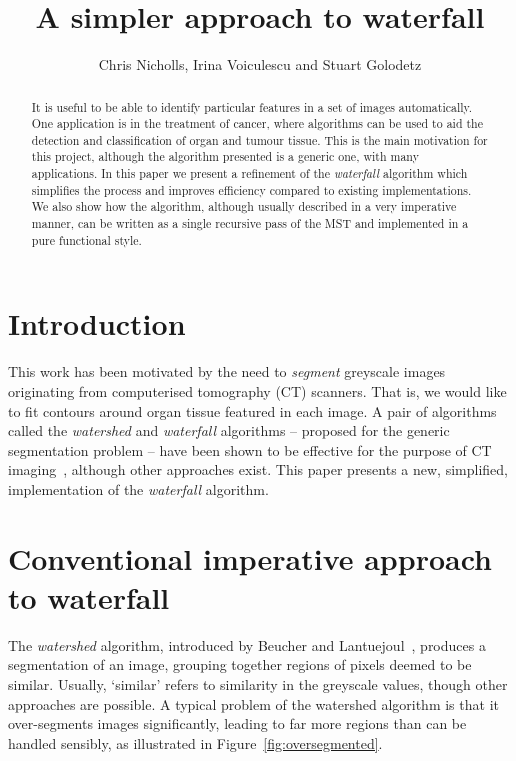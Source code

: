 \documentclass{jfp}
\title{\LARGE \bf
A simpler approach to waterfall
}
\author{Chris Nicholls, Irina Voiculescu and Stuart Golodetz
}
\begin{document}
\maketitle

\begin{abstract}
It is useful to be able to identify particular features in a set of
images automatically. One application is in the treatment of cancer,
where algorithms can be used to aid the detection and classification
of organ and tumour tissue. This is the main motivation for this
project, although the algorithm presented is a generic one, with many
applications.
In this paper we present a refinement of the {\em waterfall\/}
algorithm which simplifies the process and improves efficiency
compared to existing implementations.
We also show how the algorithm, although usually described in a very
imperative manner, can be written as a single recursive pass of the MST
and implemented in a pure functional style.


\end{abstract}

\section{Introduction}

This work has been motivated by the need to {\em segment\/} greyscale
images originating from computerised tomography (CT) scanners. That
is, we would like to fit contours around organ tissue featured in each
image. A pair of algorithms called the {\em watershed\/} and {\em
waterfall\/} algorithms -- proposed for the generic segmentation
  problem -- have been shown to be effective for the purpose of CT
  imaging~\cite{golodetz}, although other approaches exist. This paper
  presents a new, simplified, implementation of the {\em waterfall\/}
  algorithm.

\section{Conventional imperative approach to waterfall}

The {\em watershed\/} algorithm, introduced by Beucher and
Lantuejoul~\cite{beucher79}, produces a segmentation of an image,
grouping together regions of pixels deemed to be similar. Usually,
`similar' refers to similarity in the greyscale values, though other
approaches are possible. A typical problem of the watershed algorithm
is that it over-segments images significantly, leading to far more
regions than can be handled sensibly, as illustrated in
Figure~\ref{fig:oversegmented}.
\end{document}
